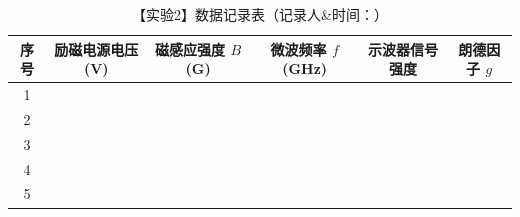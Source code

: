 \begin{table}[h!]
	\centering
	\caption{【实验2】数据记录表（记录人\&时间：\hspace{4cm}）}
	\renewcommand{\arraystretch}{1.5}
	\begin{tabular}{|c|c|c|c|c|c|}
		\hline
		\textbf{序号} & \textbf{励磁电源电压 (V)} & \textbf{磁感应强度 $B$ (G)} & \textbf{微波频率 $f$ (GHz)} & \textbf{示波器信号强度} & \textbf{朗德因子 $g$} \\ \hline
		1 & \hspace{3cm} & \hspace{2.5cm} & \hspace{2.5cm} & \hspace{2.5cm} & \hspace{2.5cm} \\ \hline
		2 & \hspace{3cm} & \hspace{2.5cm} & \hspace{2.5cm} & \hspace{2.5cm} & \hspace{2.5cm} \\ \hline
		3 & \hspace{3cm} & \hspace{2.5cm} & \hspace{2.5cm} & \hspace{2.5cm} & \hspace{2.5cm} \\ \hline
		4 & \hspace{3cm} & \hspace{2.5cm} & \hspace{2.5cm} & \hspace{2.5cm} & \hspace{2.5cm} \\ \hline
		5 & \hspace{3cm} & \hspace{2.5cm} & \hspace{2.5cm} & \hspace{2.5cm} & \hspace{2.5cm} \\ \hline
	\end{tabular}
\end{table}

